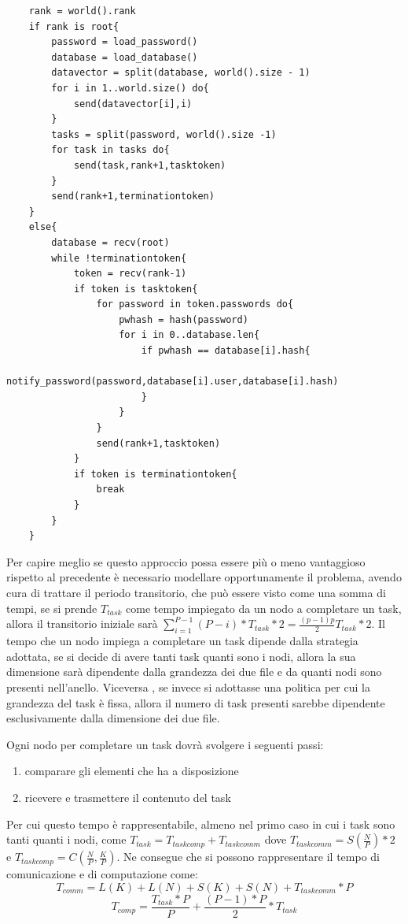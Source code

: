 \begin{lstlisting}
    rank = world().rank 
    if rank is root{
        password = load_password()
        database = load_database()
        datavector = split(database, world().size - 1)
        for i in 1..world.size() do{
            send(datavector[i],i)
        }
        tasks = split(password, world().size -1)
        for task in tasks do{
            send(task,rank+1,tasktoken)
        }
        send(rank+1,terminationtoken)
    }
    else{
        database = recv(root)
        while !terminationtoken{
            token = recv(rank-1)
            if token is tasktoken{
                for password in token.passwords do{
                    pwhash = hash(password)
                    for i in 0..database.len{
                        if pwhash == database[i].hash{
                            notify_password(password,database[i].user,database[i].hash)
                        }
                    }
                }
                send(rank+1,tasktoken)
            }
            if token is terminationtoken{
                break
            }
        }
    }
\end{lstlisting}

Per capire meglio se questo approccio possa essere più o meno vantaggioso rispetto al precedente è necessario modellare opportunamente il problema, avendo cura di trattare il periodo transitorio, che può essere visto come una somma di tempi, se si prende $T_{task}$ come tempo impiegato da un nodo a completare un task, allora il transitorio iniziale sarà $\sum_{i=1}^{P-1}(P-i)*T_{task}*2=\frac{(p-1)p}{2}T_{task}*2$. Il tempo che un nodo impiega a completare un task dipende dalla strategia adottata, se si decide di avere tanti task quanti sono i nodi, allora la sua dimensione sarà dipendente dalla grandezza dei due file e da quanti nodi sono presenti nell'anello. Viceversa , se invece si adottasse una politica per cui la grandezza del task è fissa, allora il numero di task presenti sarebbe dipendente esclusivamente dalla dimensione dei due file.

Ogni nodo per completare un task dovrà svolgere i seguenti passi:
\begin{enumerate}
    \item comparare gli elementi che ha a disposizione 
    \item ricevere e trasmettere il contenuto del task 
\end{enumerate}

Per cui questo tempo è rappresentabile, almeno nel primo caso in cui i task sono tanti quanti i nodi, come $T_{task} = T_{taskcomp} + T_{taskcomm}$ dove $T_{taskcomm} =S(\frac{N}{P})*2$ e $T_{taskcomp} = C(\frac{N}{P},\frac{K}{P})$. Ne consegue che si possono rappresentare il tempo di comunicazione e di computazione come:
$$ T_{comm} = L(K) + L(N) + S(K) + S(N) + T_{taskcomm}*P $$
$$ T_{comp} = \frac{T_{task}*P}{P} + \frac{(P-1)*P}{2}*T_{task} $$

